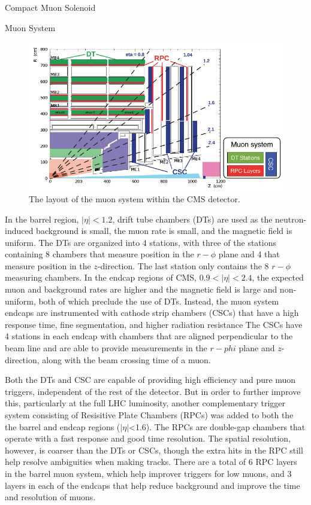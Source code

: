 \begin{section}{Compact Muon Solenoid}
\begin{subsection}{Muon System}
\begin{figure}[tbp!]
\begin{center}
\includegraphics[angle=0,width=0.80\columnwidth]{fig/cms_muonsys.png}
\end{center}
\caption{The layout of the muon system within the CMS detector.~\cite{1748-0221-8-04-P04005}}
\label{fig:cms_muonsys}
\end{figure}

In the barrel region, $|\eta|<1.2$, drift tube chambers (DTs) are used as the neutron-induced background is small, the muon rate is small, and the magnetic field is uniform.
The DTs are organized into 4 stations, with three of the stations containing 8 chambers that measure position in the $r-\phi$ plane and 4 that measure position in the $z$-direction.
The last station only contains the 8 $r-\phi$ measuring chambers.
In the endcap regions of CMS, $0.9<|\eta|<2.4$, the expected muon and background rates are higher and the magnetic field is large and non-uniform, both of which preclude the use of DTs.
Instead, the muon system endcaps are instrumented with cathode strip chambers (CSCs) that have a high response time, fine segmentation, and higher radiation resistance
The CSCs have 4 stations in each endcap with chambers that are aligned perpendicular to the beam line and are able to provide measurements in the $r-phi$ plane and $z$-direction, along with the beam crossing time of a muon.

Both the DTs and CSC are capable of providing high efficiency and pure muon \pT triggers, independent of the rest of the detector.
But in order to further improve this, particularly at the full LHC luminosity, another complementary trigger system consisting of Resisitive Plate Chambers (RPCs) was added to both the the barrel and endcap regions ($|\eta|$<1.6).
The RPCs are double-gap chambers that operate with a fast response and good time resolution.
The spatial resolution, however, is coarser than the DTs or CSCs, though the extra hits in the RPC still help resolve ambiguities when making tracks.
There are a total of 6 RPC layers in the barrel muon system, which help improver triggers for low \pT muons, and 3 layers in each of the endcaps that help reduce background and improve the time and \pT resolution of muons.


\end{subsection}
\end{section}
